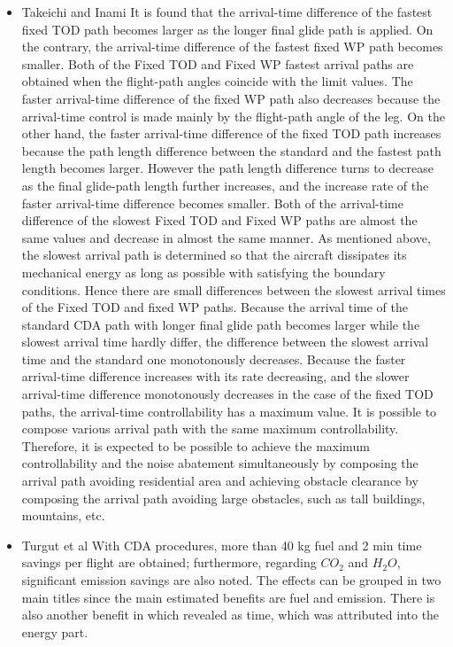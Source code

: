 \documentclass{aer1315-pretty}
\begin{document}
\begin{itemize}
\item Takeichi and Inami \cite{Takeichi:2010}
   It is found that the arrival-time difference of the fastest ﬁxed TOD
path becomes larger as the longer ﬁnal glide path is applied. On the contrary, the arrival-time difference of the fastest ﬁxed WP path becomes smaller. Both of the
Fixed TOD and Fixed WP fastest arrival paths are obtained when the ﬂight-path angles coincide with the limit values. The faster arrival-time difference of the ﬁxed WP path also decreases because the arrival-time control is made mainly by the ﬂight-path angle of the leg. On the other hand, the faster arrival-time difference of the ﬁxed TOD path increases because the path length difference between the standard and the fastest path length becomes larger. However the path length difference turns to decrease as the ﬁnal glide-path length further increases, and the increase rate of the faster arrival-time difference becomes smaller. Both of the arrival-time difference of the slowest Fixed TOD and Fixed WP  paths are almost the same values and decrease in almost the same manner. As mentioned above, the slowest arrival path is determined so that the aircraft dissipates its mechanical energy as long as possible with satisfying the boundary conditions. Hence there are small differences between the slowest arrival times of the Fixed TOD and ﬁxed WP paths. Because the arrival time of the standard CDA path with longer ﬁnal glide path becomes larger while the slowest arrival time hardly differ, the difference between the slowest arrival time and the standard one monotonously decreases. Because the faster arrival-time difference increases with its rate decreasing, and the slower arrival-time difference monotonously decreases in the case of the ﬁxed TOD paths, the arrival-time controllability has a maximum value. It is
possible to compose various arrival path with the same maximum controllability. Therefore, it is expected to be possible to achieve the maximum controllability and the noise abatement simultaneously by composing the arrival path avoiding residential area and achieving obstacle clearance by composing the arrival path avoiding large obstacles, such as tall buildings, mountains, etc.


\item Turgut et al \cite{Enis:2010}
With CDA procedures, more than 40 kg fuel and 2 min time savings per flight are obtained; furthermore, regarding $CO_2$ and $H_2O$, significant emission savings are also noted.  The effects can be grouped in two main titles since the main estimated benefits are fuel and emission. There is also another benefit in which revealed as time, which was attributed into the energy part.


\end{itemize}
\end{document}
